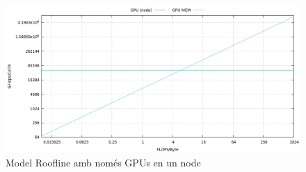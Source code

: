 \begin{figure}[H]
    \centering
    \includegraphics[width=\textwidth]{entregable/img/roofline_gpun_memgpu}
    \caption{Model Roofline amb només GPUs en un node}
    \label{fig:summary}
\end{figure}

%
